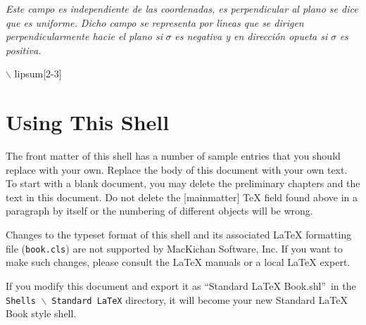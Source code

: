 \documentclass{book}%
\begin{document}
\begin{example}
\textit{\noindent Este campo es independiente de las coordenadas, es
perpendicular al plano se dice que es uniforme. Dicho campo se representa por
l\'{\i}neas que se dirigen perpendicularmente hacie el plano si }$\sigma
$\textit{ es negativa y en direcci\'{o}n opueta si }$\sigma$\textit{ es
positiva. }%

\end{example}%
%

\begin{example}%
%

$\backslash$%
lipsum[2-3]%

\end{example}%


\chapter{Using This Shell}

The front matter of this shell has a number of sample entries that you should
replace with your own. Replace the body of this document with your own text.
To start with a blank document, you may delete the preliminary chapters and
the text in this document. Do not delete the [mainmatter]
\TeX{}
field found above in a paragraph by itself or the numbering of different
objects will be wrong.

Changes to the typeset format of this shell and its associated \LaTeX{}
formatting file (\texttt{book.cls}) are not supported by MacKichan Software,
Inc. If you want to make such changes, please consult the \LaTeX{} manuals or
a local \LaTeX{} expert.

If you modify this document and export it as \textquotedblleft Standard LaTeX
Book.shl\textquotedblright\ in the \texttt{Shells%
$\backslash$%
Standard LaTeX} directory, it will become your new Standard LaTeX Book style shell.
\end{document}
